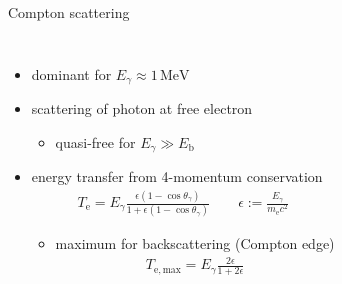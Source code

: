 \documentclass[11pt,xcolor=dvipsnames,professionalfonts]{beamer}
\begin{document}
\begin{frame}{Compton scattering}
\begin{columns}
	\begin{itemize}
		\setlength\itemsep{1.5em}
		\item dominant for $E_\gamma \approx 1 \, \mathrm{MeV}$
		
		\item scattering of photon at free electron
		\begin{itemize}
			\item quasi-free for $E_\gamma \gg E_\mathrm{b}$
		\end{itemize}
		
		\item energy transfer from 4-momentum conservation
		\begin{align*}
			T_\mathrm{e} = E_\gamma \frac{\epsilon (1 - \cos\theta_\gamma)}{1 + \epsilon (1 - \cos\theta_\gamma)} \qquad \epsilon := \frac{E_\gamma}{m_\mathrm{e}c^2}
		\end{align*}
		\begin{itemize}
			\item maximum for backscattering (Compton edge)
			\begin{align*}
				T_\mathrm{e, max} = E_\gamma \frac{2\epsilon}{1+ 2\epsilon}
			\end{align*}
		\end{itemize}
		
	\end{itemize}
	

\end{columns}
\end{frame}
\end{document}

